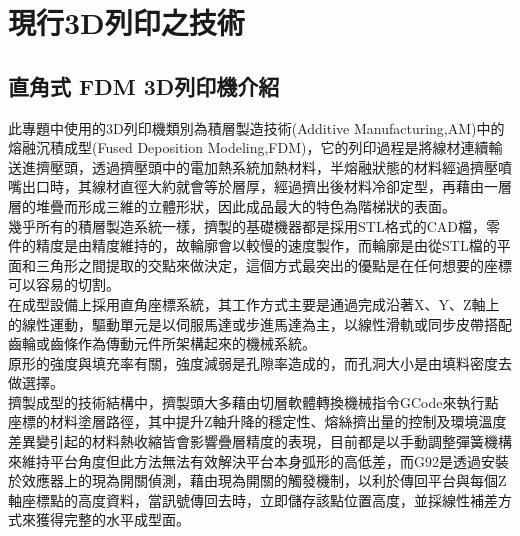 \chapter{現行3D列印之技術}

\section{直角式  FDM 3D列印機介紹}

 此專題中使用的3D列印機類別為積層製造技術(Additive Manufacturing,AM)中的熔融沉積成型(Fused Deposition Modeling,FDM)，它的列印過程是將線材連續輸送進擠壓頭，透過擠壓頭中的電加熱系統加熱材料，半熔融狀態的材料經過擠壓噴嘴出口時，其線材直徑大約就會等於層厚，經過擠出後材料冷卻定型，再藉由一層層的堆疊而形成三維的立體形狀，因此成品最大的特色為階梯狀的表面。\\

 幾乎所有的積層製造系統一樣，擠製的基礎機器都是採用STL格式的CAD檔，零件的精度是由精度維持的，故輪廓會以較慢的速度製作，而輪廓是由從STL檔的平面和三角形之間提取的交點來做決定，這個方式最突出的優點是在任何想要的座標可以容易的切割。\\

 在成型設備上採用直角座標系統，其工作方式主要是通過完成沿著X、Y、Z軸上的線性運動，驅動單元是以伺服馬達或步進馬達為主，以線性滑軌或同步皮帶搭配齒輪或齒條作為傳動元件所架構起來的機械系統。\\

 原形的強度與填充率有關，強度減弱是孔隙率造成的，而孔洞大小是由填料密度去做選擇。\\

 擠製成型的技術結構中，擠製頭大多藉由切層軟體轉換機械指令GCode來執行點座標的材料塗層路徑，其中提升Z軸升降的穩定性、熔絲擠出量的控制及環境溫度差異變引起的材料熱收縮皆會影響疊層精度的表現，目前都是以手動調整彈簧機構來維持平台角度但此方法無法有效解決平台本身弧形的高低差，而G92是透過安裝於效應器上的現為開關偵測，藉由現為開關的觸發機制，以利於傳回平台與每個Z軸座標點的高度資料，當訊號傳回去時，立即儲存該點位置高度，並採線性補差方式來獲得完整的水平成型面。\\


